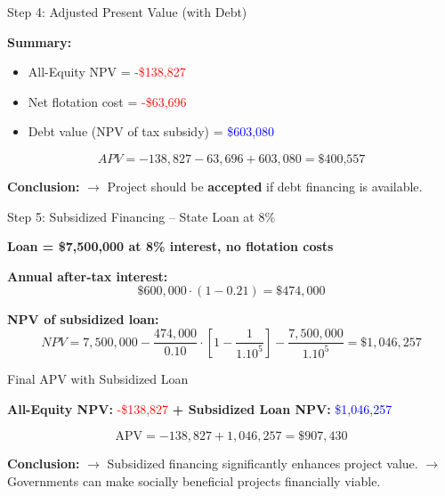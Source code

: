 \begin{frame}{Step 4: Adjusted Present Value (with Debt)}
	
	\textbf{Summary:}
	\begin{itemize}
		\item All-Equity NPV = \textcolor{red}{-\$138,827}
		\item Net flotation cost = \textcolor{red}{-\$63,696}
		\item Debt value (NPV of tax subsidy) = \textcolor{blue}{\$603,080}
	\end{itemize}
	
	\vspace{2mm}
	\[
	APV = -138,827 - 63,696 + 603,080 = \boxed{\text{\$400,557}}
	\]
	
	\textbf{Conclusion:}  
	$\rightarrow$ Project should be \textbf{accepted} if debt financing is available.
	
\end{frame}

\begin{frame}{Step 5: Subsidized Financing -- State Loan at 8\%}
	
	\textbf{Loan = \$7,500,000 at 8\% interest, no flotation costs}
	
	\textbf{Annual after-tax interest:}
	\[
	\$600,000 \cdot (1 - 0.21) = \$474,000
	\]
	
	\textbf{NPV of subsidized loan:}
	\[
	NPV = 7,500,000 - \frac{474,000}{0.10} \cdot \left[1 - \frac{1}{1.10^5}\right] - \frac{7,500,000}{1.10^5}
	= \boxed{\$1,046,257}
	\]
	
\end{frame}

\begin{frame}{Final APV with Subsidized Loan}
	
	\textbf{All-Equity NPV:} \textcolor{red}{-\$138,827}  
	\textbf{+ Subsidized Loan NPV:} \textcolor{blue}{\$1,046,257}
	
	\[
	\text{APV} = -138,827 + 1,046,257 = \boxed{\$907,430}
	\]
	
	\textbf{Conclusion:}  
	$\rightarrow$ Subsidized financing significantly enhances project value.  
	$\rightarrow$ Governments can make socially beneficial projects financially viable.
	
\end{frame}
